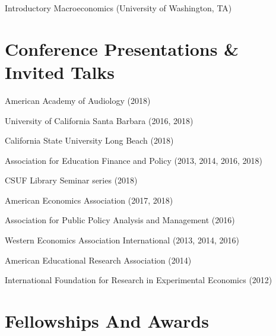 \documentclass[11pt,a4paper,serif]{moderncv}
\begin{document}
Introductory Macroeconomics (University of Washington, TA)



\section{Conference Presentations \& Invited Talks}  
  
American Academy of Audiology (2018)



University of California Santa Barbara (2016, 2018)



California State University Long Beach (2018)



Association for Education Finance and Policy (2013, 2014, 2016, 2018)



CSUF Library Seminar series (2018)



American Economics Association (2017, 2018)



Association for Public Policy Analysis and Management (2016)



Western Economics Association International (2013, 2014, 2016)



American Educational Research Association (2014)



International Foundation for Research in Experimental Economics (2012)



\section{Fellowships And Awards}  
  
       
\end{document}
